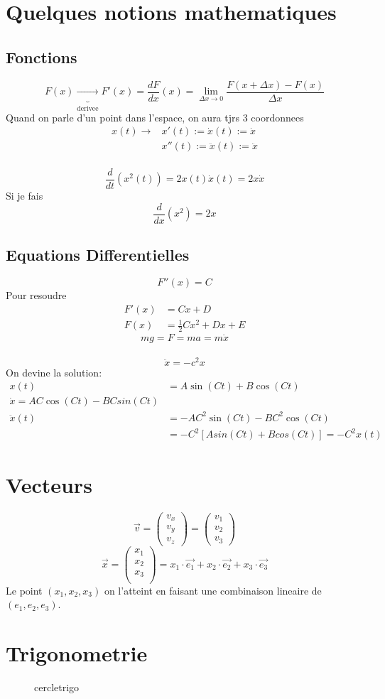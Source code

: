 \documentclass[../main.tex]{subfiles}
\begin{document}
\section{Quelques notions mathematiques}
\subsection{Fonctions}
\[ 
	F(x) \underbrace{ \longrightarrow }_{\text{derivee}} F'(x) = \frac{dF}{dx}(x) = \lim_{\Delta x \to 0} \frac{F(x+\Delta x) -F(x)}{\Delta x}
\]
Quand on parle d'un point dans l'espace, on aura tjrs 3 coordonnees
\begin{align*}
	x(t) \longrightarrow &x'(t) := \dot{x} ( t) := \dot{x}\\
	&x''(t) := \ddot{x}(t) := \ddot{x}
\end{align*}
\hr\\
\[ 
	\frac{d}{dt}(x^{2}(t)) = 2 x(t) \dot{x}(t) = 2x \dot{x}
\]
Si je fais
\[ 
	\frac{d}{dx}(x^{2}) = 2x
\]
\subsection{Equations Differentielles}
\[ 
	F''(x) = C
\]
Pour resoudre
\begin{align*}
	F'(x) &= Cx + D\\
	F(x) &= \frac{1}{2}Cx^{2} + Dx + E
\end{align*}
\[ 
	mg = F = ma = m\ddot{x}
\]
\hr\\
\[ 
	\ddot{x}= -c^{2}x
\]
On devine la solution:
\begin{align*}
	x(t) &= A \sin(Ct) + B \cos(Ct)\\
	\dot{x} = AC \cos ( Ct) - BC sin(Ct)\\
	\ddot{x}(t) &= -AC^{2}\sin(Ct) - BC^{2} \cos(Ct)\\
		    &= - C^{2} [ A sin(Ct) + Bcos(Ct)] = -C^{2} x(t)
\end{align*}
\section{Vecteurs}
\[ 
\vec{v} = \begin{pmatrix}
v_x \\
v_y\\
v_z
\end{pmatrix}
= 
\begin{pmatrix}
v_1\\
v_2\\
v_3
\end{pmatrix}
\]
\[ 
\vec{x} = 
\begin{pmatrix}
x_1\\
x_2\\
x_3\\
\end{pmatrix} = x_1 \cdot \vec{e_1} + x_2 \cdot \vec{e_2} + x_3 \cdot \vec{e_3}
\]
Le point $(x_1,x_2,x_3)$ on l'atteint en faisant une combinaison lineaire de $(e_1,e_2,e_3)$.
\section{Trigonometrie}
\begin{figure}[ht]
    \centering
    \caption{cercletrigo}
    \label{fig:cercletrigo}
\end{figure}
\end{document}
